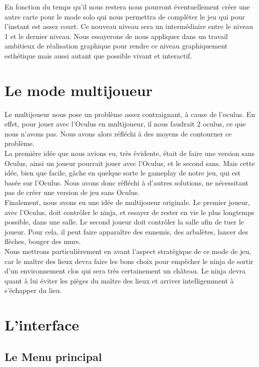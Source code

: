 \documentclass[12pt]{article}
\begin{document}
En fonction du temps qu'il nous restera nous pourront éventuellement créer une autre carte pour le mode solo qui nous permettra de compléter le jeu qui pour l'instant est assez court. Ce nouveau niveau sera un intermédiaire entre le niveau 1 et le dernier niveau. Nous essayerons de nous appliquer dans un travail ambitieux de réalisation graphique pour rendre ce niveau graphiquement esthétique mais aussi autant que possible vivant et interactif.


\section{Le mode multijoueur}

Le multijoueur nous pose un problème assez contraignant, à cause de l'oculus. En effet, pour jouer avec l'Oculus en multijoueur, il nous faudrait 2 oculus, ce que nous n'avons pas. Nous avons alors réfléchi à des moyens de contourner ce problème.\\
La première idée que nous avions eu, très évidente, était de faire une version sans Oculus, ainsi un joueur pourrait jouer avec l'Oculus, et le second sans. Mais cette idée, bien que facile, gâche en quelque sorte le gameplay de notre jeu, qui est basée sur l'Oculus. Nous avons donc réfléchi à d'autres solutions, ne nécessitant pas de créer une version de jeu sans Oculus.\\
Finalement, nous avons eu une idée de multijoueur originale. Le premier joueur, avec l'Oculus, doit contrôler le ninja, et essayer de rester en vie le plus longtemps possible, dans une salle. Le second joueur doit contrôler la salle afin de tuer le joueur. Pour cela, il peut faire apparaître des ennemis, des arbalètes, lancer des flèches, bouger des murs.\\
Nous mettrons particulièrement en avant l'aspect stratégique de ce mode de jeu, car le maître des lieux devra faire les bons choix pour empêcher le ninja de sortir d'un environnement clos qui sera très certainement un château. Le ninja devra quant à lui éviter les pièges du maître des lieux et arriver intelligemment à s'échapper du lieu.

\section{L'interface}

\subsection{Le Menu principal}
\end{document}
